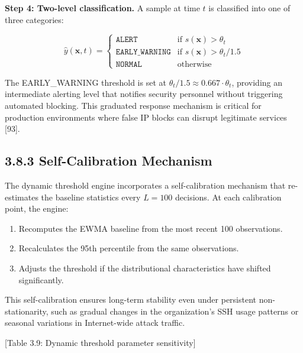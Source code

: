\documentclass[
  a4paper]{report}
\providecommand{\tightlist}{%
  \setlength{\itemsep}{0pt}\setlength{\parskip}{0pt}}
\begin{document}
\textbf{Step 4: Two-level classification.} A sample at time \(t\) is
classified into one of three categories:

\[\hat{y}(\mathbf{x}, t) = \begin{cases} \texttt{ALERT} & \text{if } s(\mathbf{x}) > \theta_t \\ \texttt{EARLY\_WARNING} & \text{if } s(\mathbf{x}) > \theta_t / 1.5 \\ \texttt{NORMAL} & \text{otherwise} \end{cases}\]

The EARLY\_WARNING threshold is set at
\(\theta_t / 1.5 \approx 0.667 \cdot \theta_t\), providing an
intermediate alerting level that notifies security personnel without
triggering automated blocking. This graduated response mechanism is
critical for production environments where false IP blocks can disrupt
legitimate services {[}93{]}.

\subsection{3.8.3 Self-Calibration
Mechanism}\label{self-calibration-mechanism}

The dynamic threshold engine incorporates a self-calibration mechanism
that re-estimates the baseline statistics every \(L = 100\) decisions.
At each calibration point, the engine:

\begin{enumerate}
\def\labelenumi{\arabic{enumi}.}
\tightlist
\item
  Recomputes the EWMA baseline from the most recent 100 observations.
\item
  Recalculates the 95th percentile from the same observations.
\item
  Adjusts the threshold if the distributional characteristics have
  shifted significantly.
\end{enumerate}

This self-calibration ensures long-term stability even under persistent
non-stationarity, such as gradual changes in the organization's SSH
usage patterns or seasonal variations in Internet-wide attack traffic.

{[}Table 3.9: Dynamic threshold parameter sensitivity{]}
\end{document}
